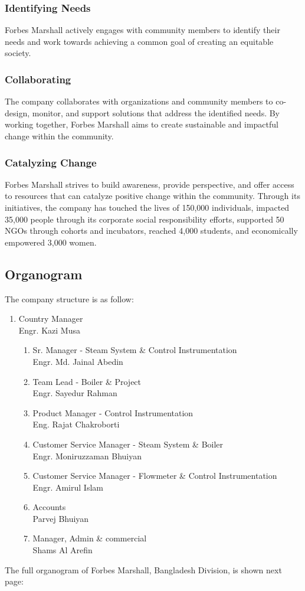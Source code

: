 \subsubsection{Identifying Needs}
Forbes Marshall actively engages with community members to identify their needs and work towards achieving a common goal of creating an equitable society.

\subsubsection{Collaborating}
The company collaborates with organizations and community members to co-design, monitor, and support solutions that address the identified needs. By working together, Forbes Marshall aims to create sustainable and impactful change within the community.

\subsubsection{Catalyzing Change}
Forbes Marshall strives to build awareness, provide perspective, and offer access to resources that can catalyze positive change within the community. Through its initiatives, the company has touched the lives of 150,000 individuals, impacted 35,000 people through its corporate social responsibility efforts, supported 50 NGOs through cohorts and incubators, reached 4,000 students, and economically empowered 3,000 women.

\subsection{Organogram}
The company structure is as follow:

\begin{enumerate}
    \item Country Manager\\Engr. Kazi Musa
    \begin{enumerate}
        \item Sr. Manager - Steam System \& Control Instrumentation\\Engr. Md. Jainal Abedin
        \item Team Lead - Boiler \& Project\\Engr. Sayedur Rahman
        \item Product Manager - Control Instrumentation\\Eng. Rajat Chakroborti
        \item Customer Service Manager - Steam System \& Boiler\\Engr. Moniruzzaman Bhuiyan
        \item Customer Service Manager - Flowmeter \& Control Instrumentation\\Engr. Amirul Islam
        \item Accounts\\Parvej Bhuiyan
        \item Manager, Admin \& commercial\\Shams Al Arefin 
    \end{enumerate}
\end{enumerate}

The full organogram of Forbes Marshall, Bangladesh Division, is shown next page: